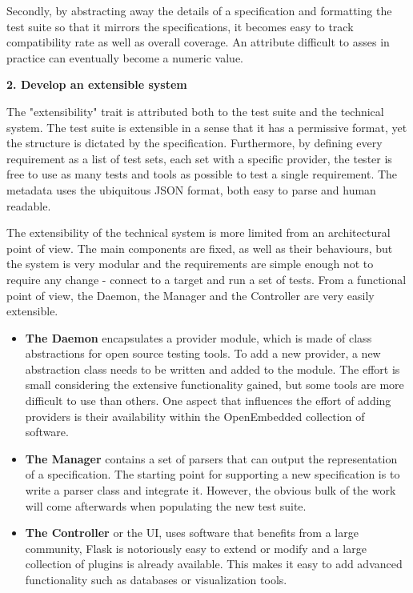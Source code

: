 Secondly, by abstracting away the details of a specification and formatting the test suite so that it mirrors the specifications, it becomes easy to track compatibility rate as well as overall coverage. An attribute difficult to asses in practice can eventually become a numeric value.

\textbf{2. Develop an extensible system}

The "extensibility" trait is attributed both to the test suite and the technical system. The test suite is extensible in a sense that it has a permissive format, yet the structure is dictated by the specification. Furthermore, by defining every requirement as a list of test sets, each set with a specific provider, the tester is free to use as many tests and tools as possible to test a single requirement. The metadata uses the ubiquitous JSON format, both easy to parse and human readable.

The extensibility of the technical system is more limited from an architectural point of view. The main components are fixed, as well as their behaviours, but the system is very modular and the requirements are simple enough not to require any change - connect to a target and run a set of tests. From a functional point of view, the Daemon, the Manager and the Controller are very easily extensible.

\begin{itemize}
\item \textbf{The Daemon} encapsulates a provider module, which is made of class abstractions for open source testing tools. To add a new provider, a new abstraction class needs to be written and added to the module. The effort is small considering the extensive functionality gained, but some tools are more difficult to use than others. One aspect that influences the effort of adding providers is their availability within the OpenEmbedded collection of software.
\item \textbf{The Manager} contains a set of parsers that can output the representation of a specification. The starting point for supporting a new specification is to write a parser class and integrate it. However, the obvious bulk of the work will come afterwards when populating the new test suite.
\item \textbf{The Controller} or the UI, uses software that benefits from a large community, Flask is notoriously easy to extend or modify and a large collection of plugins is already available. This makes it easy to add advanced functionality such as databases or visualization tools.
\end{itemize}


